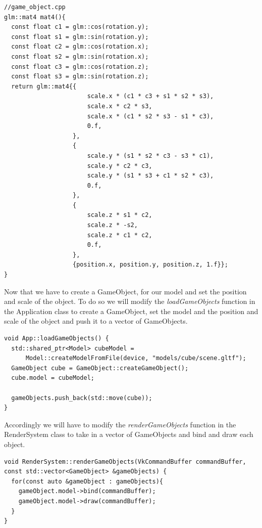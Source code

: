 \documentclass[12pt]{report} \usepackage{preamble}
\begin{document}
\begin{lstlisting}
//game_object.cpp
glm::mat4 mat4(){
  const float c1 = glm::cos(rotation.y);
  const float s1 = glm::sin(rotation.y);
  const float c2 = glm::cos(rotation.x);
  const float s2 = glm::sin(rotation.x);
  const float c3 = glm::cos(rotation.z);
  const float s3 = glm::sin(rotation.z);
  return glm::mat4{{
                       scale.x * (c1 * c3 + s1 * s2 * s3),
                       scale.x * c2 * s3,
                       scale.x * (c1 * s2 * s3 - s1 * c3),
                       0.f,
                   },
                   {
                       scale.y * (s1 * s2 * c3 - s3 * c1),
                       scale.y * c2 * c3,
                       scale.y * (s1 * s3 + c1 * s2 * c3),
                       0.f,
                   },
                   {
                       scale.z * s1 * c2,
                       scale.z * -s2,
                       scale.z * c1 * c2,
                       0.f,
                   },
                   {position.x, position.y, position.z, 1.f}};
}
\end{lstlisting}

Now that we have to create a GameObject, for our model and set the position and scale of the object.
To do so we will modify the \textit{loadGameObjects} function in the Application class to create a GameObject, set the model and the position and scale of the object
and push it to a vector of GameObjects.

\begin{lstlisting}[Language=C++]
void App::loadGameObjects() {
  std::shared_ptr<Model> cubeModel =
      Model::createModelFromFile(device, "models/cube/scene.gltf");
  GameObject cube = GameObject::createGameObject();
  cube.model = cubeModel;

  gameObjects.push_back(std::move(cube));
}
\end{lstlisting}

Accordingly we will have to modify the \textit{renderGameObjects} function in the RenderSystem class to take in a vector of GameObjects and bind and draw each object.

\begin{lstlisting}[Language=C++]
void RenderSystem::renderGameObjects(VkCommandBuffer commandBuffer, const std::vector<GameObject> &gameObjects) {
  for(const auto &gameObject : gameObjects){
    gameObject.model->bind(commandBuffer);
    gameObject.model->draw(commandBuffer);
  }
}
\end{lstlisting}
\end{document}
